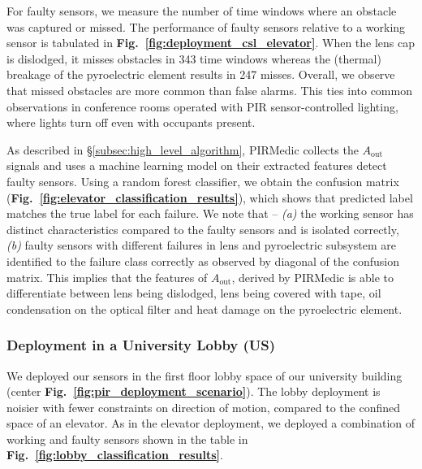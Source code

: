 \documentclass[manuscript]{acmart}
\newcommand{\ca}{{\it (a) }}
\newcommand{\cb}{{\it (b) }}
\newcommand{\aout}{$A_{\text{out}}$\xspace}
\newcommand{\sol}{{PIRMedic}\xspace}
\begin{document}
For faulty sensors, we measure the number of time windows where an obstacle was captured or missed. 
The performance of faulty sensors relative to a working sensor is tabulated in {\bfseries Fig.~\ref{fig:deployment_csl_elevator}}. 
When the lens cap is dislodged, it misses obstacles in 343 time windows whereas the (thermal) breakage of the pyroelectric element results in 247 misses. 
Overall, we observe that missed obstacles are more common than false alarms.
This ties into common observations in conference rooms operated with PIR sensor-controlled lighting, where lights turn off even with occupants present.


As described in \S\ref{subsec:high_level_algorithm}, \sol collects the \aout signals and uses a machine learning model on their extracted features detect faulty sensors. Using a random forest classifier, we obtain the confusion matrix ({\bfseries Fig.~\ref{fig:elevator_classification_results}}), which shows that predicted label matches the true label for each failure. 
We note that -- \ca the working sensor has distinct characteristics compared to the faulty sensors and is isolated correctly, \cb faulty sensors with different failures in lens and pyroelectric subsystem are identified to the failure class correctly as observed by diagonal of the confusion matrix. This implies that the features of \aout, derived by \sol is able to differentiate between lens being dislodged, lens being covered with tape, oil condensation on the optical filter and heat damage on the pyroelectric element.



\subsubsection{Deployment in a University Lobby (US)}\label{subsubsec:lobby} We deployed our sensors in the first floor lobby space of our university building (center {\bfseries Fig.~\ref{fig:pir_deployment_scenario}}). The lobby deployment is noisier with fewer constraints on direction of motion, compared to the confined space of an elevator. As in the elevator deployment, we deployed a combination of working and faulty sensors shown in the table in {\bfseries Fig.~\ref{fig:lobby_classification_results}}.
\end{document}
